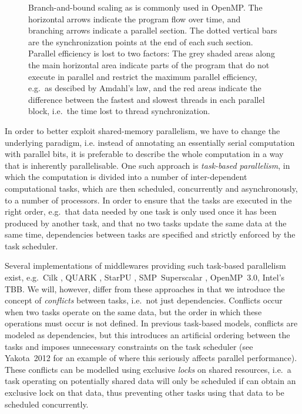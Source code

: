 \documentclass[final]{siamltex}
\begin{document}
\begin{figure}
    \centerline{}
    
    \caption{Branch-and-bound scaling as is commonly used in OpenMP.
        The horizontal arrows indicate the program flow over time, and
        branching arrows indicate a parallel section. The dotted vertical
        bars are the synchronization points at the end of each such section.
        Parallel efficiency is lost to two factors: The grey shaded areas
        along the main horizontal area indicate parts of the program that
        do not execute in parallel and restrict the maximum parallel
        efficiency, e.g.~as descibed by Amdahl's law, and the red
        areas indicate the difference between the fastest and slowest
        threads in each parallel block, i.e.~the time lost to
        thread synchronization.
        }
    \label{fig:OMPScaling}
\end{figure}


In order to better exploit shared-memory parallelism, 
we have to change the underlying paradigm, i.e. instead
of annotating an essentially serial computation with parallel
bits, it is preferable to describe the whole computation in a way that
is inherently parallelisable.
One such approach is {\em task-based parallelism}, in which the
computation is divided into a number of inter-dependent
computational tasks, which are then scheduled, concurrently
and asynchronously, to a number of processors.
In order to ensure that the tasks are executed in the right
order, e.g.~that data needed by one task is only used once it
has been produced by another task, and that no two tasks
update the same data at the same time, dependencies between
tasks are specified and strictly enforced by the task
scheduler.

Several implementations of middlewares providing such task-based
parallelism exist, e.g.~Cilk \cite{ref:Blumofe1995}, QUARK \cite{ref:QUARK},
StarPU \cite{ref:Augonnet2011}, SMP~Superscalar \cite{ref:SMPSuperscalar},
OpenMP~3.0, Intel's TBB.
We will, however, differ from these approaches in that we introduce the
concept of {\em conflicts} between tasks, i.e.~not just dependencies.
Conflicts occur when two tasks operate on the same data, 
but the order in which these operations must occur is not defined.
In previous task-based models, conflicts are modeled as dependencies,
but this introduces an artificial ordering between the tasks
and imposes unnecessary constraints on the task scheduler
(see Yakota~2012 for an example of where this seriously
affects parallel performance).
These conflicts can be modelled using exclusive {\em locks} on shared
resources, i.e.~a task operating on potentially shared data will
only be scheduled if can obtain an exclusive lock on that data,
thus preventing other tasks using that data to be scheduled concurrently.
\end{document}

